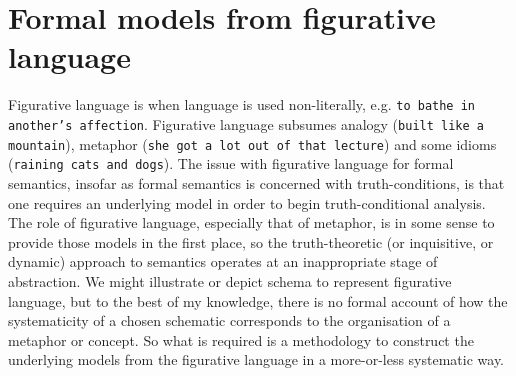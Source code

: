 \section{Formal models from figurative language}\label{sec:metaphor}

Figurative language is when language is used non-literally, e.g. \texttt{to bathe in another's affection}. Figurative language subsumes analogy (\texttt{built like a mountain}), metaphor (\texttt{she got a lot out of that lecture}) and some idioms (\texttt{raining cats and dogs}). The issue with figurative language for formal semantics, insofar as formal semantics is concerned with truth-conditions, is that one requires an underlying model in order to begin truth-conditional analysis. The role of figurative language, especially that of metaphor, is in some sense to provide those models in the first place, so the truth-theoretic (or inquisitive, or dynamic) approach to semantics operates at an inappropriate stage of abstraction. We might illustrate or depict schema to represent figurative language, but to the best of my knowledge, there is no formal account of how the systematicity of a chosen schematic corresponds to the organisation of a metaphor or concept. So what is required is a methodology to construct the underlying models from the figurative language in a more-or-less systematic way.\\


